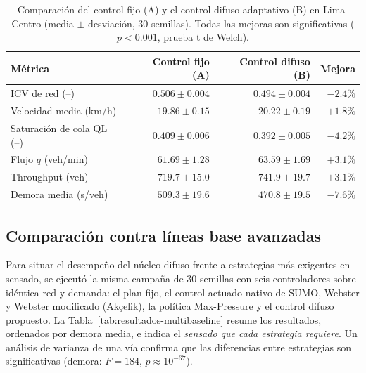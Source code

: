 \begin{table}[H]
  \centering
  \footnotesize
  \caption{Comparación del control fijo (A) y el control difuso adaptativo (B) en Lima-Centro (media $\pm$ desviación, 30 semillas). Todas las mejoras son significativas ($p<0.001$, prueba t de Welch).}
  \label{tab:resultados-ab}
  \begin{tabularx}{\linewidth}{@{}X r r r@{}}
    \toprule
    \textbf{Métrica} & \textbf{Control fijo (A)} & \textbf{Control difuso (B)} & \textbf{Mejora}\\
    \midrule
    ICV de red (--)            & $0.506 \pm 0.004$ & $0.494 \pm 0.004$ & $-2.4\%$\\
    Velocidad media (km/h)     & $19.86 \pm 0.15$  & $20.22 \pm 0.19$  & $+1.8\%$\\
    Saturación de cola QL (--) & $0.409 \pm 0.006$ & $0.392 \pm 0.005$ & $-4.2\%$\\
    Flujo $q$ (veh/min)        & $61.69 \pm 1.28$  & $63.59 \pm 1.69$  & $+3.1\%$\\
    Throughput (veh)           & $719.7 \pm 15.0$  & $741.9 \pm 19.7$  & $+3.1\%$\\
    Demora media (s/veh)       & $509.3 \pm 19.6$  & $470.8 \pm 19.5$  & $-7.6\%$\\
    \bottomrule
  \end{tabularx}
\end{table}

\subsection{Comparación contra líneas base avanzadas}

Para situar el desempeño del núcleo difuso frente a estrategias más exigentes en sensado, se ejecutó la misma
campaña de 30 semillas con seis controladores sobre idéntica red y demanda: el plan fijo, el control actuado
nativo de SUMO, Webster y Webster modificado (Akçelik), la política Max-Pressure y el control difuso propuesto.
La Tabla~\ref{tab:resultados-multibaseline} resume los resultados, ordenados por demora media, e indica el
\emph{sensado que cada estrategia requiere}. Un análisis de varianza de una vía confirma que las diferencias
entre estrategias son significativas (demora: $F=184$, $p\approx10^{-67}$).

